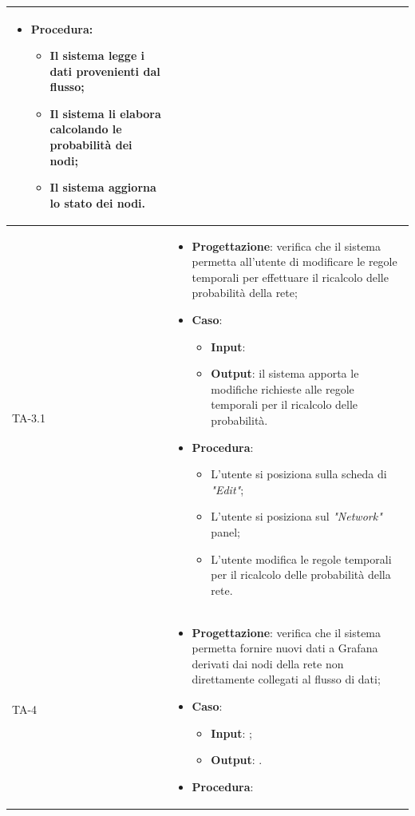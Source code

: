 \begin{longtable}{|C{2.5cm}|C{13cm}|}
\begin{itemize}
\begin{itemize}
	\end{itemize}
	\item \textbf{Procedura}:
	\begin{itemize}
		\item Il sistema legge i dati provenienti dal flusso;
		\item Il sistema li elabora calcolando le probabilità dei nodi;
		\item Il sistema aggiorna lo stato dei nodi.
	\end{itemize} 
\end{itemize}\\
\hline
{TA-3.1} &
\begin{itemize}
	\item \textbf{Progettazione}: verifica che il sistema permetta all'utente di modificare le regole temporali per effettuare il ricalcolo delle probabilità della rete;
	\item \textbf{Caso}: 
	\begin{itemize}
		\item \textbf{Input}: 
		\item \textbf{Output}: il sistema apporta le modifiche richieste alle regole temporali per il ricalcolo delle probabilità.
	\end{itemize}
	\item \textbf{Procedura}:
	\begin{itemize}
		\item L'utente si posiziona sulla scheda di \emph{"Edit"};
		\item L'utente si posiziona sul \emph{"Network"} panel;
		\item L'utente modifica le regole temporali per il ricalcolo delle probabilità della rete.
	\end{itemize} 
\end{itemize} \\
\hline
{TA-4} &
\begin{itemize}
	\item \textbf{Progettazione}: verifica che il sistema permetta fornire nuovi dati a Grafana derivati dai nodi
	della rete non direttamente collegati al flusso di
	dati;
	\item \textbf{Caso}: 
	\begin{itemize}
		\item \textbf{Input}: ;
		\item \textbf{Output}: .
	\end{itemize}
	\item \textbf{Procedura}:
	\begin{itemize}

\end{itemize}
\end{itemize}
\end{longtable}
